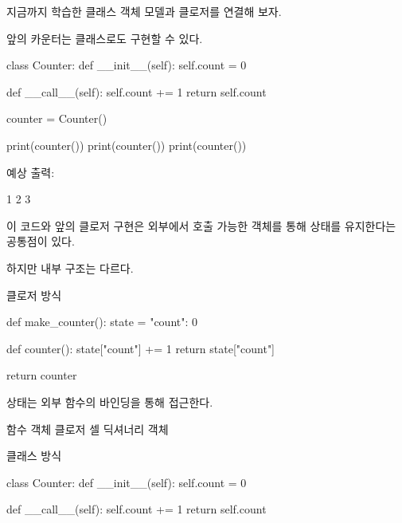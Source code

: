 지금까지 학습한 클래스 객체 모델과 클로저를 연결해 보자.

앞의 카운터는 클래스로도 구현할 수 있다.

\begin{dhkcode}
class Counter:
    def __init__(self):
        self.count = 0

    def __call__(self):
        self.count += 1
        return self.count


counter = Counter()

print(counter())
print(counter())
print(counter())
\end{dhkcode}

예상 출력:

\begin{dhkzsh}
1
2
3
\end{dhkzsh}

이 코드와 앞의 클로저 구현은 외부에서 호출 가능한 객체를 통해 상태를 유지한다는 공통점이 있다.

하지만 내부 구조는 다르다.

\begin{dhknote}
\begin{dhksmry}[centered]
클로저 방식
\end{dhksmry}
\end{dhknote}

\begin{dhkcode}
def make_counter():
    state = {"count": 0}

    def counter():
        state["count"] += 1
        return state["count"]

    return counter
\end{dhkcode}

상태는 외부 함수의 바인딩을 통해 접근한다.

\begin{dhksmry}[centered]
함수 객체
\da
클로저 셀
\da
딕셔너리 객체
\end{dhksmry}

\begin{dhknote}
\begin{dhksmry}[centered]
클래스 방식
\end{dhksmry}
\end{dhknote}

\begin{dhkcode}
class Counter:
    def __init__(self):
        self.count = 0

    def __call__(self):
        self.count += 1
        return self.count
\end{dhkcode}

